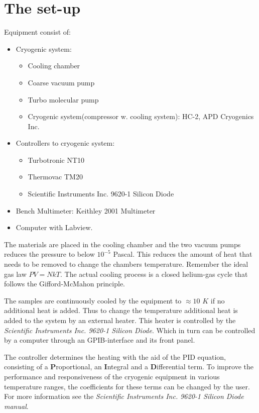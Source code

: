 \documentclass[a4paper,12pt]{article}
\begin{document}
\section{The set-up}
Equipment consist of:
\begin{itemize}
\item Cryogenic system:
\begin{itemize}
\item Cooling chamber
\item Coarse vacuum pump
\item Turbo molecular pump
\item Cryogenic system(compressor w. cooling system): HC-2, APD Cryogenics Inc.
\end{itemize}
\item Controllers to cryogenic system: 
\begin{itemize}
\item Turbotronic NT10
\item Thermovac TM20
\item Scientific Instruments Inc. 9620-1 Silicon Diode
\end{itemize} 
\item Bench Multimeter: Keithley 2001 Multimeter
\item Computer with Labview.
\end{itemize}

The materials are placed in the cooling chamber and the two vacuum pumps reduces the pressure to below $10^{-5}$ Pascal. This reduces the amount of heat that needs to be removed to change the chambers temperature. Remember the ideal gas law $PV=NkT$. The actual cooling process is a closed helium-gas cycle that follows the Gifford-McMahon principle.

The samples are continuously cooled by the equipment to $\approx 10$ $K$ if no additional heat is added. Thus to change the temperature additional heat is added to the system by an external heater. This heater is controlled by the \emph{Scientific Instruments Inc. 9620-1 Silicon Diode}. Which in turn can be controlled by a computer through an GPIB-interface and its front panel. 

The controller determines the heating with the aid of the PID equation, consisting of a \textbf{P}roportional, an \textbf{I}ntegral and a \textbf{D}ifferential term. To improve the performance and responsiveness of the cryogenic equipment in various temperature ranges, the coefficients for these terms can be changed by the user. For more information see the \emph{Scientific Instruments Inc. 9620-1 Silicon Diode manual}.
\end{document}
